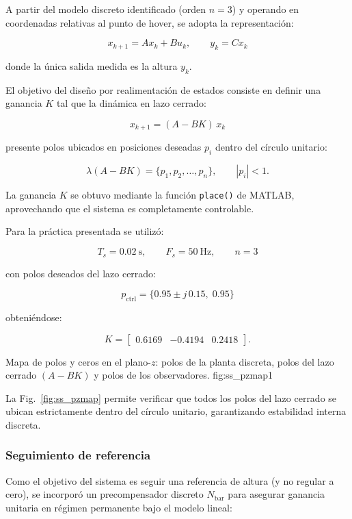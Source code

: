 A partir del modelo discreto identificado (orden $n=3$) y operando en
coordenadas relativas al punto de hover, se adopta la representación:

\[
x_{k+1}=Ax_k+Bu_k,
\qquad
y_k=Cx_k
\]

donde la única salida medida es la altura $y_k$.

El objetivo del diseño por realimentación de estados consiste en
definir una ganancia $K$ tal que la dinámica en lazo cerrado:

\[
x_{k+1}=(A-BK)\,x_k
\]

presente polos ubicados en posiciones deseadas $p_i$ dentro del círculo unitario:

\[
\lambda(A-BK)=\{p_1,p_2,\dots,p_n\},
\qquad |p_i|<1.
\]

La ganancia $K$ se obtuvo mediante la función \texttt{place()} de MATLAB,
aprovechando que el sistema es completamente controlable.

Para la práctica presentada se utilizó:

\[
T_s = 0.02~\text{s},
\qquad
F_s=50~\text{Hz},
\qquad
n=3
\]

con polos deseados del lazo cerrado:

\[
p_{\text{ctrl}}=\{0.95\pm j\,0.15,\;0.95\}
\]

obteniéndose:

\[
K=
\begin{bmatrix}
	0.6169 & -0.4194 & 0.2418
\end{bmatrix}.
\]

{Mapa de polos y ceros en el plano-$z$: polos de la planta discreta, polos del lazo cerrado $(A-BK)$ y polos de los observadores.}
{fig:ss_pzmap}{1}

La Fig.~\ref{fig:ss_pzmap} permite verificar que todos los polos del lazo
cerrado se ubican estrictamente dentro del círculo unitario, garantizando
estabilidad interna discreta.

\subsubsection{Seguimiento de referencia}

Como el objetivo del sistema es seguir una referencia de altura (y no
regular a cero), se incorporó un precompensador discreto
$N_{\text{bar}}$ para asegurar ganancia unitaria en régimen permanente
bajo el modelo lineal:

